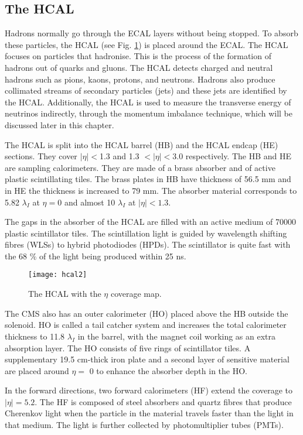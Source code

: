\begin{normalsize}
\subsection{The HCAL}

Hadrons normally go through the ECAL layers without being stopped. To absorb these particles, the HCAL \cite{HCAL_TDR} (see Fig. \ref{hcal2}) is placed around the ECAL. The HCAL focuses on particles that hadronise. This is the process of the formation of hadrons out of quarks and gluons. The HCAL detects charged and neutral hadrons such as pions, kaons, protons, and neutrons. Hadrons also produce collimated streams of secondary particles (jets) and these jets are identified by the HCAL. Additionally, the HCAL is used to measure the transverse energy of neutrinos indirectly, through the momentum imbalance technique, which will be discussed later in this chapter. 

The HCAL is split into the HCAL barrel (HB) and the HCAL endcap (HE) sections. They cover $ |\eta| < $1.3 and 1.3 $< |\eta| < $3.0 respectively. The HB and HE are sampling calorimeters. They are made of a brass absorber and of active plastic scintillating tiles. The brass plates in HB have thickness of 56.5 mm and in HE the thickness is increased to 79 mm. The absorber material corresponds to 5.82 $\lambda_I$ at $\eta = 0$ and almost 10 $\lambda_I$ at $|\eta| < 1.3$.

The gaps in the absorber of the HCAL are filled with an active medium of 70000 plastic scintillator tiles. The scintillation light is guided by wavelength shifting fibres (WLSs) to hybrid photodiodes (HPDs). The scintillator is quite fast with the 68 $\%$ of the light being produced within 25 ns.

\begin{figure}[H]
  \centering
  \texttt{[image: hcal2]}
  \caption[The HCAL]{The HCAL with the $\eta$ coverage map.}
  \label{hcal2}
\end{figure}


The CMS also has an outer calorimeter (HO) placed above the HB outside the solenoid. HO is called a tail catcher system and increases the total calorimeter thickness to 11.8 $\lambda_I$ in the barrel, with the magnet coil working as an extra absorption layer. The HO consists of five rings of scintillator tiles. A supplementary 19.5 cm-thick iron plate and a second layer of sensitive material are placed around $\eta =$ 0 to enhance the absorber depth in the HO. 

In the forward directions, two forward calorimeters (HF) extend the coverage to  $|\eta| = 5.2$. The HF is composed of steel absorbers and quartz fibres that produce Cherenkov light when the particle in the material travels faster than the light in that medium. The light is further collected by photomultiplier tubes (PMTs). 



\end{normalsize}
